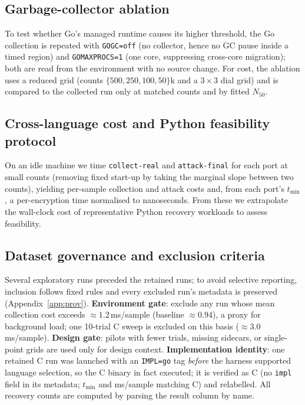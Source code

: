 \documentclass[11pt]{article}
\begin{document}
\subsection{Garbage-collector ablation}
\label{sec:method-gc}
To test whether Go's managed runtime causes its higher threshold, the Go
collection is repeated with \texttt{GOGC=off} (no collector, hence no GC pause
inside a timed region) and \texttt{GOMAXPROCS=1} (one core, suppressing
cross-core migration); both are read from the environment with no source change.
For cost, the ablation uses a reduced grid (counts $\{500,250,100,50\}$k and a
$3\times3$ dial grid) and is compared to the collected run only at matched counts
and by fitted $N_{50}$.

\subsection{Cross-language cost and Python feasibility protocol}
\label{sec:method-python}
On an idle machine we time \texttt{collect-real} and \texttt{attack-final} for
each port at small counts (removing fixed start-up by taking the marginal slope
between two counts), yielding per-sample collection and attack costs and, from
each port's $t_{\min}$, a per-encryption time normalised to nanoseconds. From
these we extrapolate the wall-clock cost of representative Python recovery
workloads to assess feasibility.

\subsection{Dataset governance and exclusion criteria}
\label{sec:method-governance}
Several exploratory runs preceded the retained runs; to avoid selective
reporting, inclusion follows fixed rules and every excluded run's metadata is
preserved (Appendix~\ref{app:prov}). \textbf{Environment gate}: exclude any run
whose mean collection cost exceeds $\approx1.2$\,ms/sample (baseline
$\approx0.94$), a proxy for background load; one 10-trial C sweep is excluded on
this basis ($\approx3.0$\,ms/sample). \textbf{Design gate}: pilots with fewer
trials, missing sidecars, or single-point grids are used only for design context.
\textbf{Implementation identity}: one retained C run was launched with an
\texttt{IMPL=go} tag \emph{before} the harness supported language selection, so
the C binary in fact executed; it is verified as C (no \texttt{impl} field in its
metadata; $t_{\min}$ and ms/sample matching C) and relabelled. All recovery
counts are computed by parsing the result column by name.
\end{document}

